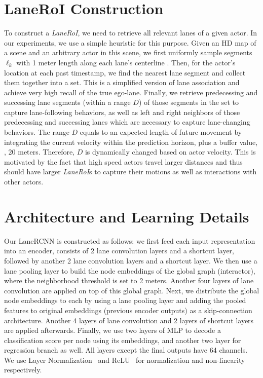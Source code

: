\section{LaneRoI Construction}
\label{sec:supp_roi}
To construct a \textit{LaneRoI}, we need to retrieve all relevant lanes of a
given actor. In our experiments, we use a simple heuristic for this purpose.
Given an HD map of a scene and an arbitrary actor in this scene, we first
uniformly sample segments $\ell_k$ with 1 meter length along each lane's centerline
. Then, for the actor's location at each past timestamp, we find the nearest
lane segment and collect them together into a set.
This is a simplified version
of lane association and achieve very high recall of the true ego-lane.
Finally, we retrieve predecessing and successing lane segments (within a range
$D$) of those segments in the set to capture lane-following behaviors, 
as well as left and right neighbors
of those predecessing and successing lanes which are necessary to capture lane-changing behaviors.
The range $D$ equals to an expected length of future movement by integrating
the current velocity within the prediction horizon, plus a buffer value, \eg, 20
meters. Therefore, $D$ is dynamically changed based on actor velocity. This is
motivated by the fact that high speed actors travel larger distances and thus
should have larger \textit{LaneRoI}s to capture their motions as well as interactions with
other actors.

\section{Architecture and Learning Details}
\label{sec:supp_implement}
Our LaneRCNN is constructed as follows: we first feed each input \ROI
representation into an encoder, consists of 2 lane convolution layers
and a shortcut layer, followed by another 2 lane convolution layers and a
shortcut layer. We then use a lane pooling layer to build the node embeddings of
the global graph (interactor), where the neighborhood threshold is set to 2
meters. Another four layers of lane convolution are applied on top of this global
graph. Next, we distribute the global node embeddings to each \ROI by
using a lane pooling layer and adding the pooled features to original \ROI
embeddings (previous encoder outputs) as a skip-connection architecture. Another
4 layers of lane convolution and 2 layers of shortcut layers are applied
afterwards. Finally, we use two layers of MLP to decode a classification score
per node using its embeddings, and another two layer for regression branch as
well. All layers except the final outputs have 64 channels. We use Layer
Normalization~\cite{layernorm} and ReLU~\cite{relu} for normalization and
non-linearity respectively.

